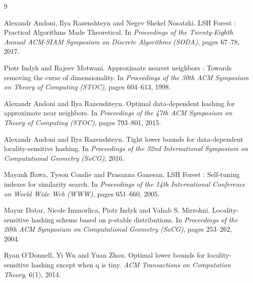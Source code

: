 \documentclass[11pt]{article}
\begin{document}
\begin{thebibliography}{9}

Alexandr Andoni, Ilya Razenshteyn and Negev Shekel Nosatzki.
\newblock LSH Forest : Practical Algorithms Made Theoretical.
\newblock In \emph{Proceedings of the Twenty-Eighth Annual ACM-SIAM Symposium on Discrete Algorithms (SODA)}, pages 67--78, 2017.

Piotr Indyk and Rajeev Motwani.
\newblock Approximate nearest neighbors : Towards removing the curse of dimensionality.
\newblock In \emph{Proceedings of the 30th ACM Symposium on Theory of Computing (STOC)}, pages 604--613, 1998.

Alexandr Andoni and Ilya Razenshteyn.
\newblock Optimal data-dependent hashing for approximate near neighbors.
\newblock In \emph{Proceedings of the 47th ACM Symposium on Theory of Computing (STOC)}, pages 793--801, 2015.

Alexandr Andoni and Ilya Razenshteyn.
\newblock Tight lower bounds for data-dependent locality-sensitive hashing.
\newblock In \emph{Proceedings of the 32nd International Symposium on Computational Geometry (SoCG)}, 2016.

Mayank Bawa, Tyson Condie and Prasanna Ganesan.
\newblock LSH Forest : Self-tuning indexes for similarity search.
\newblock In \emph{Proceedings of the 14th International Conference on World Wide Web (WWW)}, pages 651--660, 2005.

Mayur Datar, Nicole Immorlica, Piotr Indyk and Vahab S. Mirrokni.
\newblock Locality-sensitive hashing scheme based on p-stable distributions.
\newblock In \emph{Proceedings of the 20th ACM Symposium on Computational Geometry (SoCG)}, pages 253--262, 2004.

Ryan O'Donnell, Yi Wu and Yuan Zhou.
\newblock Optimal lower bounds for locality-sensitive hashing except when q is tiny.
\newblock \emph{ACM Transactions on Computation Theory}, 6(1), 2014.

\end{thebibliography}
\end{document}

